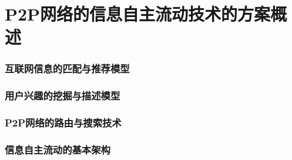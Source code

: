 \section{P2P网络的信息自主流动技术的方案概述}

\subsubsection{互联网信息的匹配与推荐模型}

\subsubsection{用户兴趣的挖掘与描述模型}

\subsubsection{P2P网络的路由与搜索技术}

\subsubsection{信息自主流动的基本架构}
